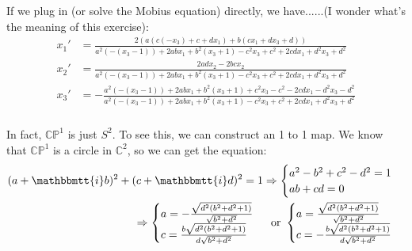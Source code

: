 \documentclass[]{ctexart}
\newcommand{\mi}{\mathbbmtt{i}}
\begin{document}
			\subsubsection{}	
				If we plug in (or solve the Mobius equation) directly, we have......(I wonder what's the meaning of this exercise):
					\begin{equation*}
					\begin{aligned}
						x_1'&=\frac{2 (a (c (-x_3)+c+d x_1)+b (c x_1+d x_3+d))}{a^2 (-(x_3-1))+2 a b x_1+b^2 (x_3+1)-c^2 x_3+c^2+2 c d x_1+d^2 x_3+d^2}\\
						x_2'&=\frac{2 a d x_2-2 b c x_2}{a^2 (-(x_3-1))+2 a b x_1+b^2 (x_3+1)-c^2 x_3+c^2+2 c d x_1+d^2 x_3+d^2}\\
						x_3'&=-\frac{a^2 (-(x_3-1))+2 a b x_1+b^2 (x_3+1)+c^2 x_3-c^2-2 c d x_1-d^2 x_3-d^2}{a^2 (-(x_3-1))+2 a b x_1+b^2 (x_3+1)-c^2 x_3+c^2+2 c d x_1+d^2 x_3+d^2}
					\end{aligned}
					\end{equation*}
		
			\subsubsection{}
				In fact, $\mathbb{CP}^1$ is just $S^2$. To see this, we can construct an 1 to 1 map. We know that $\mathbb{CP}^1$ is a circle in $\mathbb{C}^2$, so we can get the equation:
					\begin{equation*}
					\begin{aligned}
						(a+\mi b)^2+(c+\mi d)^2=1
						\Rightarrow 
						\begin{cases}
							a^2-b^2+c^2-d^2=1\\
							ab+cd=0
						\end{cases}\\
						\Rightarrow 
						\begin{cases}
							a=-\frac{\sqrt{d^2 \left(b^2+d^2+1\right)}}{\sqrt{b^2+d^2}}\\
							c=\frac{b \sqrt{d^2 \left(b^2+d^2+1\right)}}{d \sqrt{b^2+d^2}}
						\end{cases}
						\text{ or }
						\begin{cases}
							a=\frac{\sqrt{d^2 \left(b^2+d^2+1\right)}}{\sqrt{b^2+d^2}}\\
							c=-\frac{b \sqrt{d^2 \left(b^2+d^2+1\right)}}{d \sqrt{b^2+d^2}}
						\end{cases}
					\end{aligned}
					\end{equation*}
				
\end{document}
